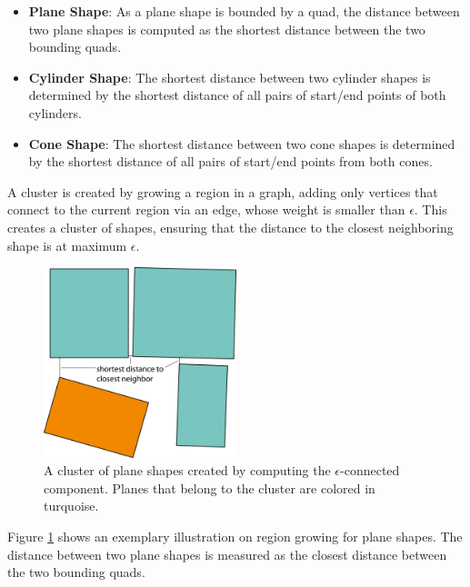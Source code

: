 \begin{itemize}
    \item \textbf{Plane Shape}:         As a plane shape is bounded by a quad, the distance between two plane shapes is computed as the shortest distance between the two bounding quads.
    \item \textbf{Cylinder Shape}:    The shortest distance between two cylinder shapes is determined by the shortest distance of all pairs of start/end points of both cylinders. 
  \item \textbf{Cone Shape}:            The shortest distance between two cone shapes is determined by the shortest distance of all pairs of start/end points from both cones. 
\end{itemize}


A cluster is created by growing a region in a graph, adding only vertices that connect to the current region via an edge, whose weight is smaller than $\epsilon$. This creates a cluster of shapes, ensuring that the distance to the closest neighboring shape is at maximum $\epsilon$. 
\\
\begin{figure}
    \centering
    \includegraphics[width=0.5\textwidth]{Shape_Detection/regionGrowingPlanes.png}
    \caption{A cluster of plane shapes created by computing the $\epsilon$-connected component. Planes that belong to the cluster are colored in turquoise.}
    \label{fig:regionGrowingPlanes}
\end{figure}

Figure \ref{fig:regionGrowingPlanes} shows an exemplary illustration on region growing for plane shapes. The distance between two plane shapes is measured as the closest distance between the two bounding quads. 

